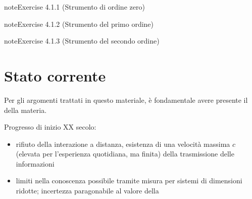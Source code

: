 \documentclass[letterpaper,10pt,italian]{jupyterBook}
\begin{document}
\begin{sphinxadmonition}{note}{Exercise 4.1.1 (Strumento di ordine zero)}



\sphinxAtStartPar
{}
\end{sphinxadmonition}
 \label{exercise:instrument-order-one-exercise}

\begin{sphinxadmonition}{note}{Exercise 4.1.2 (Strumento del primo ordine)}



\sphinxAtStartPar
{}
\end{sphinxadmonition}
 \label{exercise:instrument-order-two-exercise}

\begin{sphinxadmonition}{note}{Exercise 4.1.3 (Strumento del secondo ordine)}



\sphinxAtStartPar
{}
\end{sphinxadmonition}

\sphinxstepscope


\chapter{Stato corrente}
\label{\detokenize{ch/intro/current-status:stato-corrente}}\label{\detokenize{ch/intro/current-status:physics-hs-intro-current-status}}\label{\detokenize{ch/intro/current-status::doc}}
\sphinxAtStartPar
{} Per gli argomenti trattati in questo materiale, è fondamentale avere presente il  della materia.

\sphinxAtStartPar
Progresso di inizio XX secolo:
\begin{itemize}
\item {} 
\sphinxAtStartPar
rifiuto della interazione a distanza, esistenza di una velocità massima  \(c\) (elevata per l’esperienza quotidiana, ma finita) della trasmissione delle informazioni

\item {} 
\sphinxAtStartPar
limiti nella conoscenza possibile tramite misura per sistemi di dimensioni ridotte; incertezza paragonabile al valore della {\hyperref[\detokenize{ch/intro/measurements:physics-hs-intro-measurements}]{}}

\end{itemize}
\end{document}
